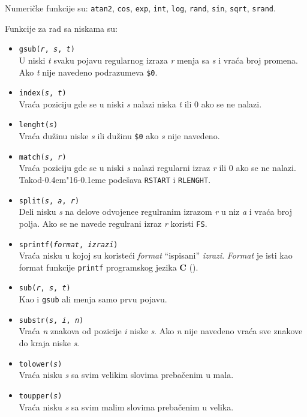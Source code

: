 \documentclass[12pt,a4paper]{article}
\def\d{d\kern-0.4em\char"16\kern-0.1em}
\begin{document}
        Numeri\v cke funkcije su: {\tt atan2}, {\tt cos}, {\tt exp},
        {\tt int}, {\tt log}, {\tt rand}, {\tt sin}, {\tt sqrt}, {\tt srand}.

        Funkcije za rad sa niskama su:
        \begin{itemize}
        \item
          {\tt gsub({\it r}, {\it s}, {\it t})}\\
          U niski {\it t} svaku pojavu regularnog izraza {\it r} menja sa
          {\it s} i vra\'ca broj promena.
          Ako {\it t} nije navedeno podrazumeva {\tt\$0}.
        \item
          {\tt index({\it s}, {\it t})}\\
          Vra\'ca poziciju gde se u niski {\it s} nalazi niska {\it t} ili 0
          ako se ne nalazi.
        \item
          {\tt lenght({\it s})}\\
          Vra\'ca du\v zinu niske {\it s} ili du\v zinu {\tt\$0} ako {\it s}
          nije navedeno.
        \item
          {\tt match({\it s}, {\it r})}\\
          Vra\'ca poziciju gde se u niski {\it s} nalazi regularni izraz
          {\it r} ili 0 ako se ne nalazi.
          Tako\d e pode\v sava {\tt RSTART} i {\tt RLENGHT}.
        \item
          {\tt split({\it s}, {\it a}, {\it r})}\\
          Deli nisku {\it s} na delove odvojenee regulranim izrazom {\it r} u
          niz {\it a} i vra\'ca broj polja.
          Ako se ne navede regulrani izraz {\it r} koristi {\tt FS}.
        \item
          {\tt sprintf({\it format}, {\it izrazi})}\\
          Vra\'ca nisku u kojoj su koriste\'ci {\it format} ``ispisani''
          {\it izrazi}.
          {\it Format} je isti kao format funkcije {\tt printf} programskog
          jezika {\bf C} (\cite{KR,AWK}).
        \item
          {\tt sub({\it r}, {\it s}, {\it t})}\\
          Kao i {\tt gsub} ali menja samo prvu pojavu.
        \item
          {\tt substr({\it s}, {\it i}, {\it n})}\\
          Vra\'ca {\it n} znakova od pozicije {\it i} niske {\it s}.
          Ako {\it n} nije navedeno vra\'ca sve znakove do kraja niske
          {\it s}.
        \item
          {\tt tolower({\it s})}\\
          Vra\'ca nisku {\it s} sa svim velikim slovima preba\v cenim u mala.
        \item
          {\tt toupper({\it s})}\\
          Vra\'ca nisku {\it s} sa svim malim slovima preba\v cenim u velika.
        \end{itemize}
\end{document}
